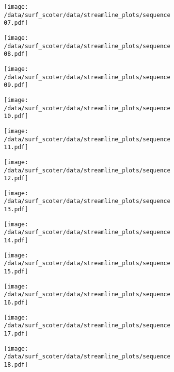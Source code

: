 \begin{figure}[h]
	\begin{subfigure}[t]{0.5\textwidth}
		\centering
		\texttt{[image: /data/surf\_scoter/data/streamline\_plots/sequence07.pdf]}
	\end{subfigure}%
	\begin{subfigure}[t]{0.5\textwidth}
		\centering
		\texttt{[image: /data/surf\_scoter/data/streamline\_plots/sequence08.pdf]}
	\end{subfigure}
	\begin{subfigure}[t]{0.5\textwidth}
		\centering
		\texttt{[image: /data/surf\_scoter/data/streamline\_plots/sequence09.pdf]}
	\end{subfigure}%
	\begin{subfigure}[t]{0.5\textwidth}
		\centering
		\texttt{[image: /data/surf\_scoter/data/streamline\_plots/sequence10.pdf]}
	\end{subfigure}
	\begin{subfigure}[t]{0.5\textwidth}
		\centering
		\texttt{[image: /data/surf\_scoter/data/streamline\_plots/sequence11.pdf]}
	\end{subfigure}%
	\begin{subfigure}[t]{0.5\textwidth}
		\centering
		\texttt{[image: /data/surf\_scoter/data/streamline\_plots/sequence12.pdf]}
	\end{subfigure}
\end{figure}

\begin{figure}[h]
	\begin{subfigure}[t]{0.5\textwidth}
		\centering
		\texttt{[image: /data/surf\_scoter/data/streamline\_plots/sequence13.pdf]}
	\end{subfigure}%
	\begin{subfigure}[t]{0.5\textwidth}
		\centering
		\texttt{[image: /data/surf\_scoter/data/streamline\_plots/sequence14.pdf]}
	\end{subfigure}
	\begin{subfigure}[t]{0.5\textwidth}
		\centering
		\texttt{[image: /data/surf\_scoter/data/streamline\_plots/sequence15.pdf]}
	\end{subfigure}%
	\begin{subfigure}[t]{0.5\textwidth}
		\centering
		\texttt{[image: /data/surf\_scoter/data/streamline\_plots/sequence16.pdf]}
	\end{subfigure}
	\begin{subfigure}[t]{0.5\textwidth}
		\centering
		\texttt{[image: /data/surf\_scoter/data/streamline\_plots/sequence17.pdf]}
	\end{subfigure}%
	\begin{subfigure}[t]{0.5\textwidth}
		\centering
		\texttt{[image: /data/surf\_scoter/data/streamline\_plots/sequence18.pdf]}
	\end{subfigure}
\end{figure}

